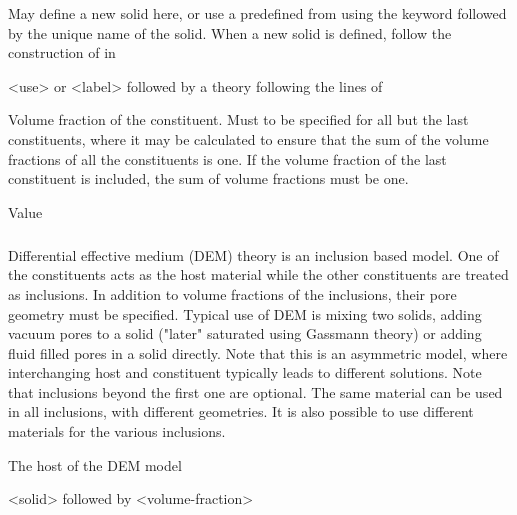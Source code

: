 {
 \slist
   \item \Description May define a new solid here, or use a predefined  from  using the keyword  followed by the unique name of the solid. When a new solid is defined, follow the construction of  in 
   \item \Argument <use> or <label> followed by a theory following the lines of 
   \item \Default
 \elist

 \slist
   \item \Description Volume fraction of the constituent. Must to be specified for all but the last constituents, where it may be calculated to ensure that the sum of the volume fractions of all the constituents is one. If the volume fraction of the last constituent is included, the sum of volume fractions must be one. 
   \item \Argument Value
   \item \Default
 \elist

\subparagraph{}
 \slist
   \item \Description Differential effective medium (DEM) theory is an inclusion based model. One of the constituents acts as the host material while the other constituents are treated as inclusions. In addition to volume fractions of the inclusions, their pore geometry must be specified. Typical use of DEM is mixing two solids, adding vacuum pores to a solid ("later" saturated using Gassmann theory) or adding fluid filled pores in a solid directly. Note that this is an asymmetric model, where interchanging host and constituent typically leads to different solutions. Note that inclusions beyond the first one are optional. The same material can be used in all inclusions, with different geometries. It is also possible to use different materials for the various inclusions.
   \item \Argument
   \item \Default 
 \elist

 \slist
   \item \Description The host of the DEM model
   \item \Argument <solid> followed by <volume-fraction>
   \item \Default
 \elist

}
